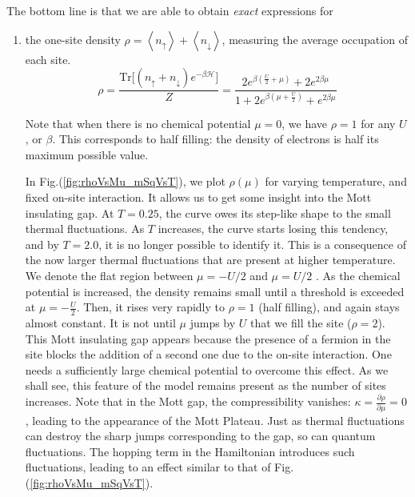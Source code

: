 The bottom line is that we are able to obtain \emph{exact} expressions for

\begin{enumerate}
\item the one-site density $\rho = \left\langle n_\uparrow \right\rangle + \left\langle n_\downarrow \right\rangle$, measuring the average occupation of each site.
\begin{equation}
\rho = \frac{\text{Tr} \big[ (n_\uparrow + n_\downarrow ) e^{-\beta\mathcal{H}} \big]}{Z} = \frac{2 e^{\beta(\frac{U}{2} + \mu)} + 2 e^{2\beta\mu}}{1 + 2 e^{\beta(\mu + \frac{U}{2})} + e^{2 \beta \mu}}
\end{equation}

Note that when there is no chemical potential $\mu = 0$, we have $\rho = 1$ for any $U$, or $\beta$.
This corresponds to half filling: the density of electrons is half its maximum possible value.

In Fig.(\ref{fig:rhoVsMu_mSqVsT}), we plot $\rho(\mu)$ for varying temperature, and fixed on-site interaction.
It allows us to get some insight into the Mott insulating gap.
At $T = 0.25$, the curve owes its step-like shape to the small thermal fluctuations.
As $T$ increases, the curve starts losing this tendency, and by $T = 2.0$, it is no longer possible to identify it.
This is a consequence of the now larger thermal fluctuations that are present at higher temperature.
We denote the flat region between $\mu = - U / 2 $ and $\mu =  U / 2 $  .
As the chemical potential is increased, the density remains small until a threshold is exceeded at $\mu = - \frac{U}{2}$. 
Then, it rises very rapidly to $\rho = 1$ (half filling), and again stays almost constant.
It is not until $\mu$ jumps by $U$ that we fill the site ($\rho = 2$).
This Mott insulating gap appears because the presence of a fermion in the site blocks the addition of a second one due to the on-site interaction.
One needs a sufficiently large chemical potential to overcome this effect.
As we shall see, this feature of the model remains present as the number of sites increases.
Note that in the Mott gap, the compressibility vanishes: $\kappa = \frac{\partial \rho}{\partial \mu} = 0$, leading to the appearance of the Mott Plateau.
Just as thermal fluctuations can destroy the sharp jumps corresponding to the gap, so can quantum fluctuations.
The hopping term in the Hamiltonian introduces such fluctuations, leading to an effect similar to that of Fig.(\ref{fig:rhoVsMu_mSqVsT}).


\end{enumerate}
